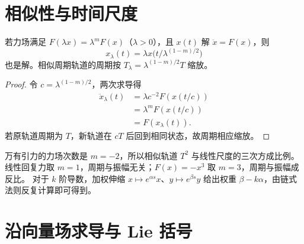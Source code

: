 \section{相似性与时间尺度}
\begin{proposition}
若力场满足 $F(\lambda x)=\lambda^mF(x)$（$\lambda>0$），且 $x(t)$ 解
$\ddot x=F(x)$，则
\[
 x_\lambda(t)=\lambda x\bigl(t/\lambda^{(1-m)/2}\bigr)
\]
也是解。相似周期轨道的周期按 $T_\lambda=\lambda^{(1-m)/2}T$ 缩放。
\end{proposition}
\begin{proof}
令 $c=\lambda^{(1-m)/2}$，两次求导得
\[
 \begin{aligned}
 \ddot x_\lambda(t)&=\lambda c^{-2}F(x(t/c))\\
 &=\lambda^mF(x(t/c))\\
 &=F(x_\lambda(t)).
\end{aligned}
\]
若原轨道周期为 $T$，新轨道在 $cT$ 后回到相同状态，故周期相应缩放。
\end{proof}
万有引力的力场次数是 $m=-2$，所以相似轨道 $T^2$ 与线性尺度的三次方成比例。
线性回复力取 $m=1$，周期与振幅无关；$F(x)=-x^3$ 取 $m=3$，周期与振幅成反比。
对于 $k$ 阶导数，加权伸缩 $x\mapsto e^{\alpha s}x$、$y\mapsto e^{\beta s}y$
给出权重 $\beta-k\alpha$，由链式法则反复计算即可得到。

\section{沿向量场求导与 Lie 括号}


